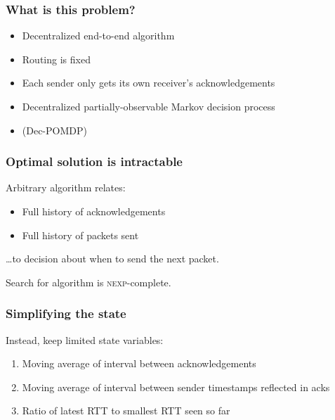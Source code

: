 \documentclass[svgnames]{beamer}
\newcommand{\ssline}{\vspace{8 pt}}
\begin{document}
\begin{frame}
\frametitle{What is this problem?}

\begin{itemize}

\item Decentralized end-to-end algorithm

\item Routing is fixed

\item Each sender only gets its own receiver's acknowledgements

\item Decentralized partially-observable Markov decision process

\item[] (Dec-POMDP)

\end{itemize}

\end{frame}

\begin{frame}
\frametitle{Optimal solution is intractable}

Arbitrary algorithm relates:

\begin{itemize}

\item Full history of acknowledgements

\item Full history of packets sent

\end{itemize}

\ldots to decision about when to send the next packet.

\ssline

Search for algorithm is \textsc{nexp}-complete.

\end{frame}

\begin{frame}
\frametitle{Simplifying the state}

Instead, keep limited state variables:

\begin{enumerate}

\item Moving average of interval between acknowledgements

\item Moving average of interval between sender timestamps reflected in acks

\item Ratio of latest RTT to smallest RTT seen so far

\end{enumerate}

\end{frame}
\end{document}
